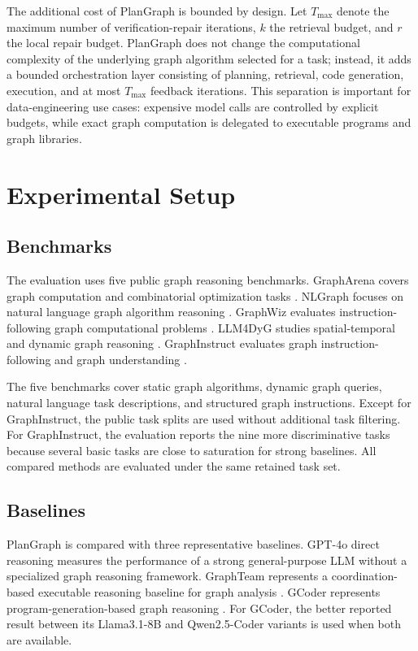 \documentclass[pdflatex,sn-mathphys-num]{sn-jnl}
\theoremstyle{thmstyleone}
\theoremstyle{thmstyletwo}
\theoremstyle{thmstylethree}
\begin{document}
The additional cost of PlanGraph is bounded by design. Let $T_{\max}$ denote the maximum number of verification-repair iterations, $k$ the retrieval budget, and $r$ the local repair budget. PlanGraph does not change the computational complexity of the underlying graph algorithm selected for a task; instead, it adds a bounded orchestration layer consisting of planning, retrieval, code generation, execution, and at most $T_{\max}$ feedback iterations. This separation is important for data-engineering use cases: expensive model calls are controlled by explicit budgets, while exact graph computation is delegated to executable programs and graph libraries.

\section{Experimental Setup}\label{sec:setup}

\subsection{Benchmarks}

The evaluation uses five public graph reasoning benchmarks. GraphArena covers graph computation and combinatorial optimization tasks \cite{tang2025grapharena}. NLGraph focuses on natural language graph algorithm reasoning \cite{chen2024nlgraph}. GraphWiz evaluates instruction-following graph computational problems \cite{gong2024graphwiz}. LLM4DyG studies spatial-temporal and dynamic graph reasoning \cite{llm4dyg2024}. GraphInstruct evaluates graph instruction-following and graph understanding \cite{graphinstruct2024}.

The five benchmarks cover static graph algorithms, dynamic graph queries, natural language task descriptions, and structured graph instructions. Except for GraphInstruct, the public task splits are used without additional task filtering. For GraphInstruct, the evaluation reports the nine more discriminative tasks because several basic tasks are close to saturation for strong baselines. All compared methods are evaluated under the same retained task set.

\subsection{Baselines}

PlanGraph is compared with three representative baselines. GPT-4o direct reasoning measures the performance of a strong general-purpose LLM without a specialized graph reasoning framework. GraphTeam represents a coordination-based executable reasoning baseline for graph analysis \cite{li2024graphteam}. GCoder represents program-generation-based graph reasoning \cite{zhang2025gcoder}. For GCoder, the better reported result between its Llama3.1-8B and Qwen2.5-Coder variants is used when both are available.
\end{document}
